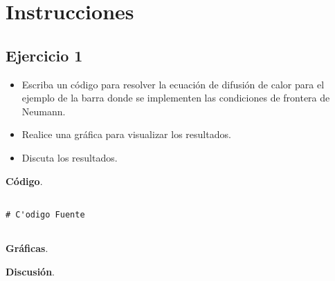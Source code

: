 \documentclass[11pt,a4paper]{article}
\begin{document}
\section*{Instrucciones}

\subsection*{Ejercicio 1}

\begin{itemize}
\item Escriba un código para resolver la ecuación de difusión de calor para el ejemplo de la barra donde se implementen las condiciones de frontera de Neumann.
\item Realice una gráfica para visualizar los resultados.
\item Discuta los resultados.
\end{itemize}

\newpage

\begin{tcolorbox}[colback=white]
\textbf{Código}.
\tcblower

\begin{lstlisting}

# C'odigo Fuente


\end{lstlisting}

\end{tcolorbox}


\begin{tcolorbox}[colback=white]
\textbf{Gráficas}.
\tcblower

\centering

\end{tcolorbox}

\begin{tcolorbox}[colback=white]
\textbf{Discusión}.
\tcblower


\end{tcolorbox}
\end{document}
